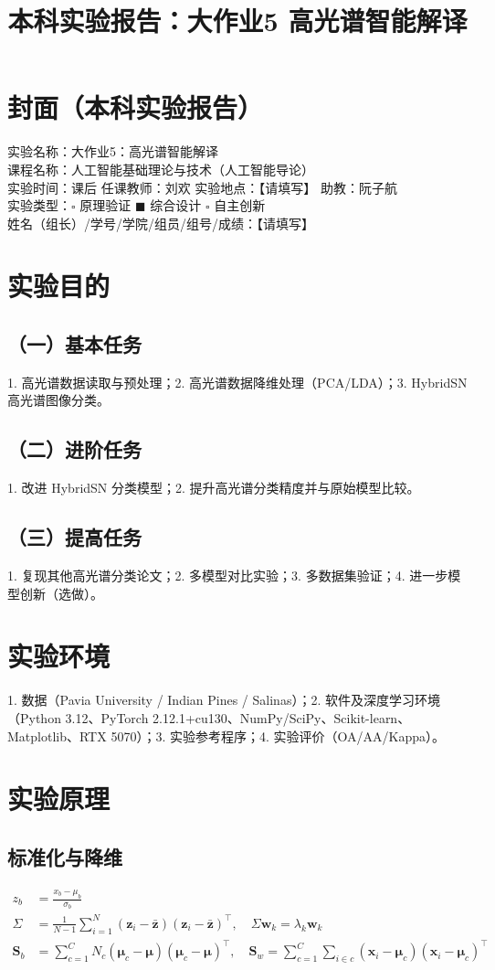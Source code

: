 \documentclass[12pt,a4paper]{article}
\title{本科实验报告：大作业5 高光谱智能解译}
\date{}
\begin{document}
\section*{封面（本科实验报告）}
实验名称：大作业5：高光谱智能解译\\
课程名称：人工智能基础理论与技术（人工智能导论）\\
实验时间：课后 \quad 任课教师：刘欢 \quad 实验地点：【请填写】 \quad 助教：阮子航\\
实验类型：$\square$ 原理验证 \quad $\blacksquare$ 综合设计 \quad $\square$ 自主创新\\
姓名（组长）/学号/学院/组员/组号/成绩：【请填写】

\section{实验目的}
\subsection{（一）基本任务}
1. 高光谱数据读取与预处理；2. 高光谱数据降维处理（PCA/LDA）；3. HybridSN 高光谱图像分类。
\subsection{（二）进阶任务}
1. 改进 HybridSN 分类模型；2. 提升高光谱分类精度并与原始模型比较。
\subsection{（三）提高任务}
1. 复现其他高光谱分类论文；2. 多模型对比实验；3. 多数据集验证；4. 进一步模型创新（选做）。

\section{实验环境}
1. 数据（Pavia University / Indian Pines / Salinas）；2. 软件及深度学习环境（Python 3.12、PyTorch 2.12.1+cu130、NumPy/SciPy、Scikit-learn、Matplotlib、RTX 5070）；3. 实验参考程序；4. 实验评价（OA/AA/Kappa）。

\section{实验原理}
\subsection{标准化与降维}
\begin{align}
z_b &= \frac{x_b - \mu_b}{\sigma_b} \\
\Sigma &= \frac{1}{N-1}\sum_{i=1}^{N}(\mathbf{z}_i - \bar{\mathbf{z}})(\mathbf{z}_i - \bar{\mathbf{z}})^{\top},\quad
\Sigma \mathbf{w}_k = \lambda_k \mathbf{w}_k \\
\mathbf{S}_b &= \sum_{c=1}^{C} N_c (\boldsymbol{\mu}_c - \boldsymbol{\mu})(\boldsymbol{\mu}_c - \boldsymbol{\mu})^{\top},\quad
\mathbf{S}_w = \sum_{c=1}^{C} \sum_{i \in c}(\mathbf{x}_i - \boldsymbol{\mu}_c)(\mathbf{x}_i - \boldsymbol{\mu}_c)^{\top}
\end{align}
\end{document}
